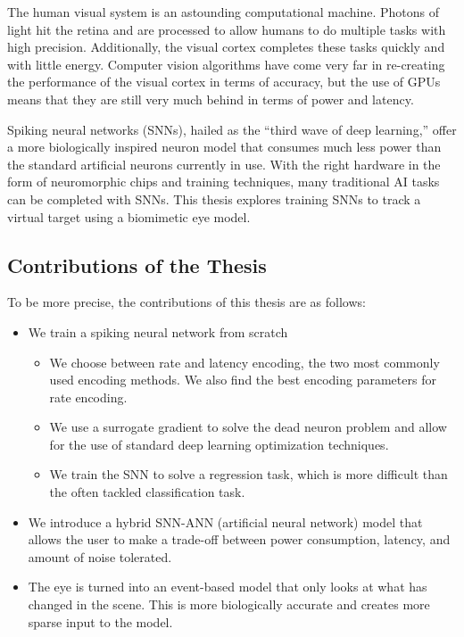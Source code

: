 \documentclass[../taasin.tex]{subfiles}
\begin{document}
The human visual system is an astounding computational machine. Photons of light hit the retina and are processed to allow humans to do multiple tasks with high precision. Additionally, the visual cortex completes these tasks quickly and with little energy. Computer vision algorithms have come very far in re-creating the performance of the visual cortex in terms of accuracy, but the use of GPUs means that they are still very much behind in terms of power and latency.

Spiking neural networks (SNNs), hailed as the “third wave of deep learning,” offer a more biologically inspired neuron model that consumes much less power than the standard artificial neurons currently in use. With the right hardware in the form of neuromorphic chips and training techniques, many traditional AI tasks can be completed with SNNs. This thesis explores training SNNs to track a virtual target using a biomimetic eye model.

\subsection{Contributions of the Thesis}

To be more precise, the contributions of this thesis are as follows:

\begin{itemize}
  \item We train a spiking neural network from scratch 
  \begin{itemize}
    \item We choose between rate and latency encoding, the two most commonly used encoding methods. We also find the best encoding parameters for rate encoding.
    \item We use a surrogate gradient to solve the dead neuron problem and allow for the use of standard deep learning optimization techniques.
    \item We train the SNN to solve a regression task, which is more difficult than the often tackled classification task.
  \end{itemize}
  \item We introduce a hybrid SNN-ANN (artificial neural network) model that allows the user to make a trade-off between power consumption, latency, and amount of noise tolerated.
  \item The eye is turned into an event-based model that only looks at what has changed in the scene. This is more biologically accurate and creates more sparse input to the model.
\end{itemize}
\end{document}
